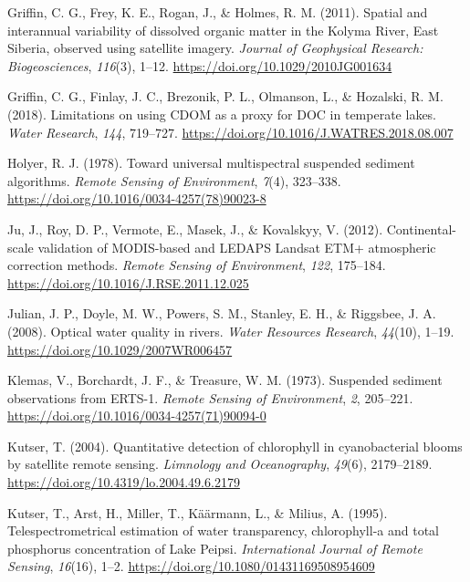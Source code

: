 \documentclass[]{article}
\begin{document}
\leavevmode\hypertarget{ref-Griffin2011}{}%
Griffin, C. G., Frey, K. E., Rogan, J., \& Holmes, R. M. (2011). Spatial
and interannual variability of dissolved organic matter in the Kolyma
River, East Siberia, observed using satellite imagery. \emph{Journal of
Geophysical Research: Biogeosciences}, \emph{116}(3), 1--12.
\url{https://doi.org/10.1029/2010JG001634}

\leavevmode\hypertarget{ref-Griffin2018}{}%
Griffin, C. G., Finlay, J. C., Brezonik, P. L., Olmanson, L., \&
Hozalski, R. M. (2018). Limitations on using CDOM as a proxy for DOC in
temperate lakes. \emph{Water Research}, \emph{144}, 719--727.
\url{https://doi.org/10.1016/J.WATRES.2018.08.007}

\leavevmode\hypertarget{ref-Holyer1978}{}%
Holyer, R. J. (1978). Toward universal multispectral suspended sediment
algorithms. \emph{Remote Sensing of Environment}, \emph{7}(4), 323--338.
\url{https://doi.org/10.1016/0034-4257(78)90023-8}

\leavevmode\hypertarget{ref-Ju2012}{}%
Ju, J., Roy, D. P., Vermote, E., Masek, J., \& Kovalskyy, V. (2012).
Continental-scale validation of MODIS-based and LEDAPS Landsat ETM+
atmospheric correction methods. \emph{Remote Sensing of Environment},
\emph{122}, 175--184. \url{https://doi.org/10.1016/J.RSE.2011.12.025}

\leavevmode\hypertarget{ref-Julian2008}{}%
Julian, J. P., Doyle, M. W., Powers, S. M., Stanley, E. H., \& Riggsbee,
J. A. (2008). Optical water quality in rivers. \emph{Water Resources
Research}, \emph{44}(10), 1--19.
\url{https://doi.org/10.1029/2007WR006457}

\leavevmode\hypertarget{ref-Klemas1973}{}%
Klemas, V., Borchardt, J. F., \& Treasure, W. M. (1973). Suspended
sediment observations from ERTS-1. \emph{Remote Sensing of Environment},
\emph{2}, 205--221. \url{https://doi.org/10.1016/0034-4257(71)90094-0}

\leavevmode\hypertarget{ref-Kutser2004}{}%
Kutser, T. (2004). Quantitative detection of chlorophyll in
cyanobacterial blooms by satellite remote sensing. \emph{Limnology and
Oceanography}, \emph{49}(6), 2179--2189.
\url{https://doi.org/10.4319/lo.2004.49.6.2179}

\leavevmode\hypertarget{ref-Kutser1995}{}%
Kutser, T., Arst, H., Miller, T., Käärmann, L., \& Milius, A. (1995).
Telespectrometrical estimation of water transparency, chlorophyll-a and
total phosphorus concentration of Lake Peipsi. \emph{International
Journal of Remote Sensing}, \emph{16}(16), 1--2.
\url{https://doi.org/10.1080/01431169508954609}
\end{document}

